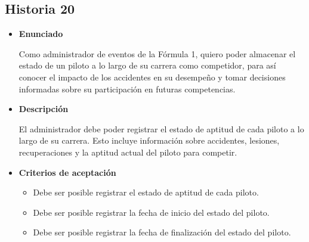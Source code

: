 \documentclass{article}
\begin{document}
	\subsection{Historia 20}
	\begin{itemize}
		
		\item \large{\textbf{Enunciado}}
		\begin{description}
Como administrador de eventos de la Fórmula 1, quiero poder almacenar el estado de un piloto a lo largo de su carrera como competidor, para así conocer el impacto de los accidentes en su desempeño y tomar decisiones informadas sobre su participación en futuras competencias.

		\end{description}
		
		\item \large{\textbf{Descripción}}
		\begin{description}
El administrador debe poder registrar el estado de aptitud de cada piloto a lo largo de su carrera. Esto incluye información sobre accidentes, lesiones, recuperaciones y la aptitud actual del piloto para competir.

		\end{description}
		
		\item \large{\textbf{Criterios de aceptación}}
		\begin{itemize}
			\item Debe ser posible registrar el estado de aptitud de cada piloto.
			\item Debe ser posible registrar la fecha de inicio del estado del piloto.
			\item Debe ser posible registrar la fecha de finalización del estado del piloto.
			
		\end{itemize}
		
	\end{itemize}
	
\end{document}
